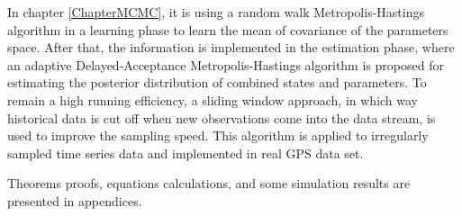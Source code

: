 In chapter \ref{ChapterMCMC}, it is using a random walk Metropolis-Hastings algorithm in a learning phase to learn the mean of covariance of the parameters space. After that, the information is implemented in the estimation phase, where an adaptive Delayed-Acceptance Metropolis-Hastings algorithm is proposed for estimating the posterior distribution of combined states and parameters. To remain a high running efficiency, a sliding window approach, in which way historical data is cut off when new observations come into the data stream, is used to improve the sampling speed. This algorithm is applied to irregularly sampled time series data and implemented in real GPS data set. 

Theorems proofs, equations calculations, and some simulation results are presented in appendices. 
